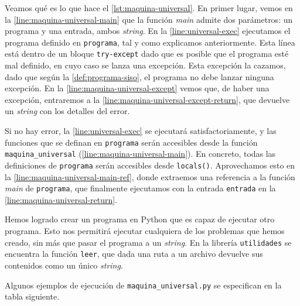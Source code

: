 Veamos qué es lo que hace el \cref{lst:maquina-universal}. En primer lugar, vemos en la \cref{line:maquina-universal-main} que la función \emph{main} admite dos parámetros: un programa y una entrada, ambos \emph{string}. En la \cref{line:universal-exec} ejecutamos el programa definido en \texttt{programa}, tal y como explicamos anteriormente. Esta línea está dentro de un bloque \texttt{try-except} dado que es posible que el programa esté mal definido, en cuyo caso se lanza una excepción. Esta excepción la cazamos, dado que según la \cref{def:programa-siso}, el programa no debe lanzar ninguna excepción. En la \cref{line:maquina-universal-except} vemos que, de haber una excepción, entraremos a la \cref{line:maquina-universal-except-return}, que devuelve un \emph{string} con los detalles del error.

Si no hay error, la \cref{line:universal-exec} se ejecutará satisfactoriamente, y las funciones que se definan en \texttt{programa} serán accesibles desde la función \texttt{maquina\_universal} (\cref{line:maquina-universal-main}). En concreto, todas las definiciones de \texttt{programa} serán accesibles desde \texttt{locals()}. Aprovechamos esto en la \cref{line:maquina-universal-main-ref}, donde extraemos una referencia a la función \emph{main} de \texttt{programa}, que finalmente ejecutamos con la entrada \texttt{entrada} en la \cref{line:maquina-universal-return}.

Hemos logrado crear un programa en Python que es capaz de ejecutar otro programa. Esto nos permitirá ejecutar cualquiera de los problemas que hemos creado, sin más que pasar el programa a un \emph{string}. En la librería \texttt{utilidades} se encuentra la función \texttt{leer}, que dada una ruta a un archivo devuelve sus contenidos como un único \emph{string}.

Algunos ejemplos de ejecución de \texttt{maquina\_universal.py} se especifican en la tabla siguiente.

